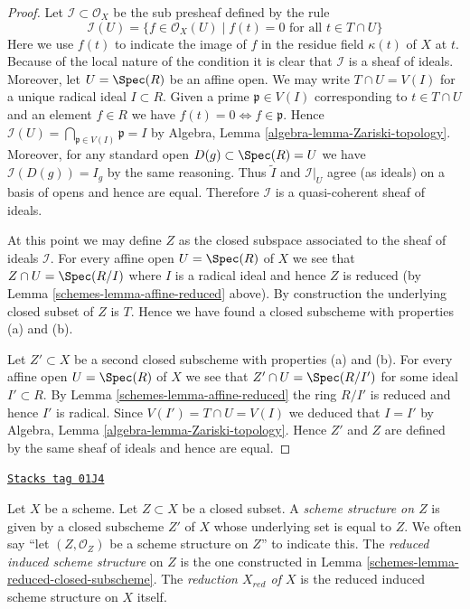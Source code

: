 \begin{proof}

Let $\mathcal{I} \subset \mathcal{O}_X$ be the sub presheaf
defined by the rule
$$
\mathcal{I}(U) = \{f \in \mathcal{O}_X(U) \mid
f(t) = 0\text{ for all }t \in T\cap U\}
$$
Here we use $f(t)$ to indicate the image of
$f$ in the residue field $\kappa(t)$ of $X$ at $t$.
Because of the local nature of the condition it is
clear that $\mathcal{I}$ is a sheaf of ideals. Moreover,
let $U = \Spec(R)$ be an affine open.
We may write $T \cap U = V(I)$ for a unique radical
ideal $I \subset R$. Given a prime $\mathfrak p \in V(I)$
corresponding to $t \in T \cap U$ and an element $f \in R$ we have
$f(t) = 0 \Leftrightarrow f \in \mathfrak p$.
Hence $\mathcal{I}(U) = \bigcap_{\mathfrak p \in V(I)} \mathfrak p
= I$ by Algebra, Lemma \ref{algebra-lemma-Zariski-topology}.
Moreover, for any standard open $D(g) \subset \Spec(R) = U$
we have $\mathcal{I}(D(g)) = I_g$ by the same reasoning.
Thus $\widetilde I$ and $\mathcal{I}|_U$ agree (as ideals)
on a basis of opens and hence are equal. Therefore
$\mathcal{I}$ is a quasi-coherent sheaf of ideals.

\medskip\noindent
At this point we may define $Z$ as the closed subspace
associated to the sheaf of ideals $\mathcal{I}$. For every
affine open $U = \Spec(R)$ of $X$ we see that
$Z \cap U = \Spec(R/I)$ where $I$ is a radical ideal and
hence $Z$ is reduced (by Lemma \ref{schemes-lemma-affine-reduced} above).
By construction the underlying closed subset of $Z$ is $T$.
Hence we have found a closed subscheme with properties (a) and (b).

\medskip\noindent
Let $Z' \subset X$ be a second closed subscheme with properties (a) and (b).
For every affine open $U = \Spec(R)$ of $X$ we see that
$Z' \cap U = \Spec(R/I')$ for some ideal $I' \subset R$.
By Lemma \ref{schemes-lemma-affine-reduced} the ring $R/I'$ is
reduced and hence $I'$ is radical. Since $V(I') = T \cap U = V(I)$
we deduced that $I = I'$ by
Algebra, Lemma \ref{algebra-lemma-Zariski-topology}.
Hence $Z'$ and $Z$ are defined by the same sheaf of ideals
and hence are equal.
\end{proof}

\begin{definition}
\label{schemes-definition-reduced-induced-scheme}
\href{https://stacks.math.columbia.edu/tag/01J4}{\texttt{Stacks tag 01J4}}

Let $X$ be a scheme. Let $Z \subset X$ be a closed subset.
A {\it scheme structure on $Z$} is given by a closed subscheme $Z'$ of
$X$ whose underlying set is equal to $Z$. We often say
``let $(Z, \mathcal{O}_Z)$ be a scheme structure on $Z$'' to
indicate this. The {\it reduced induced scheme structure}
on $Z$ is the one constructed in Lemma \ref{schemes-lemma-reduced-closed-subscheme}.
The {\it reduction $X_{red}$ of $X$} is the reduced induced scheme
structure on $X$ itself.
\end{definition}

